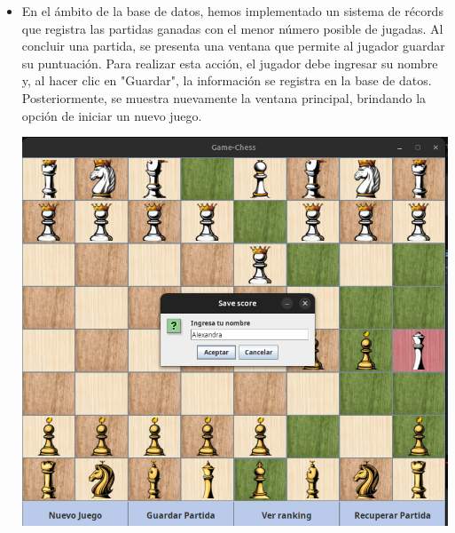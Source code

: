 \documentclass{article}
\begin{document}
\begin{itemize}
\item En el ámbito de la base de datos, hemos implementado un sistema de récords que registra las partidas ganadas con el menor número posible de jugadas. Al concluir una partida, se presenta una ventana que permite al jugador guardar su puntuación. Para realizar esta acción, el jugador debe ingresar su nombre y, al hacer clic en "Guardar", la información se registra en la base de datos. Posteriormente, se muestra nuevamente la ventana principal, brindando la opción de iniciar un nuevo juego. 
\begin{center}
    \includegraphics[width=16cm]{latex/img/5.png}
\end{center}



\end{itemize}
\end{document}
